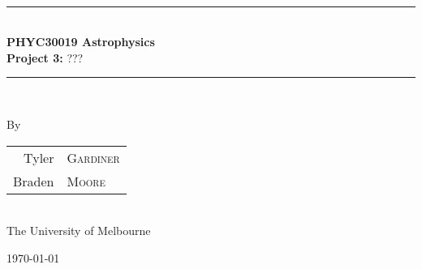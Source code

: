 \documentclass[a4paper]{article} %
\begin{document}
\pagestyle{empty}

\newcommand{\HRule}{\rule{\linewidth}{0.5mm}}

\begin{titlepage}

    \begin{center}
        \textsc{}\\[3cm]

        \HRule \\[0.5cm]
        \Huge \textbf{PHYC30019 Astrophysics}\\[0.5cm]
        \huge \textbf{Project 3:} ???\\[0.5cm] 
        \HRule \\[1.5cm]

        \begin{minipage}{0.5\textwidth}
        \begin{center}

		\vspace{3cm}
        \large By \\[0.75cm]
        \begin{tabular}{rl}
        \Large Tyler & \Large \textsc{Gardiner} \\ [0.1cm]
        \Large Braden &\Large \textsc{Moore} \\
		\end{tabular}  
		\\[1cm]
        \normalsize \normalfont 
        The University of Melbourne \\[2cm]

        \end{center}
        \end{minipage}

        \vfill

        \large \today
    \end{center}

\newpage
\end{titlepage}
\begin{comment}
\pagestyle{fancy}
\pagenumbering{gobble}
\tableofcontents
\newpage
\end{comment}

\pagestyle{fancy}
\setcounter{page}{1}
\end{document}
